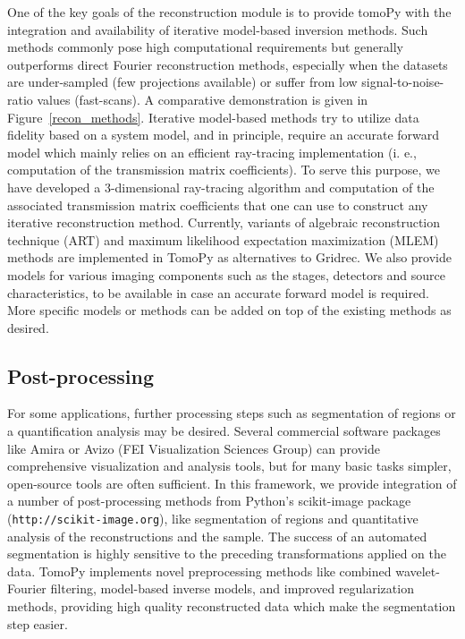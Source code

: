 \documentclass[pdf]{iucr}              %
\begin{document}
One of the key goals of the reconstruction module is to provide tomoPy with the integration and availability of iterative model-based inversion methods. Such methods commonly pose high computational requirements but generally outperforms direct Fourier reconstruction methods, especially when the datasets are under-sampled (few projections available) or suffer from low signal-to-noise-ratio values (fast-scans). A comparative demonstration is given in Figure~\ref{recon_methods}. Iterative model-based methods try to utilize data fidelity based on a system model, and in principle, require an accurate forward model which mainly relies on an efficient ray-tracing implementation (i. e., computation of the transmission matrix coefficients). To serve this purpose, we have developed a 3-dimensional ray-tracing algorithm and computation of the associated transmission matrix coefficients that one can use to construct any iterative reconstruction method. Currently, variants of algebraic reconstruction technique (ART) \cite{Gordon1970}  and maximum likelihood expectation maximization (MLEM) \cite{Dempster1977} methods are implemented in TomoPy as alternatives to Gridrec. We also provide models for various imaging components such as the stages, detectors and source characteristics, to be available in case an accurate forward model is required. More specific models or methods can be added on top of the existing methods as desired.

\subsection{Post-processing}

For some applications, further processing steps such as segmentation of regions or a quantification analysis may be desired. Several commercial software packages like Amira or Avizo (FEI Visualization Sciences Group) can provide comprehensive visualization and analysis tools, but for many basic tasks simpler, open-source tools are often sufficient. In this framework, we provide integration of a number of post-processing methods from Python's scikit-image package (\texttt{http://scikit-image.org}), like segmentation of regions and quantitative analysis of the reconstructions and the sample. The success of an automated segmentation is highly sensitive to the preceding transformations applied on the data. TomoPy implements novel preprocessing methods like combined wavelet-Fourier filtering, model-based inverse models, and improved regularization methods, providing high quality reconstructed data which make the segmentation step easier. 
\end{document}
